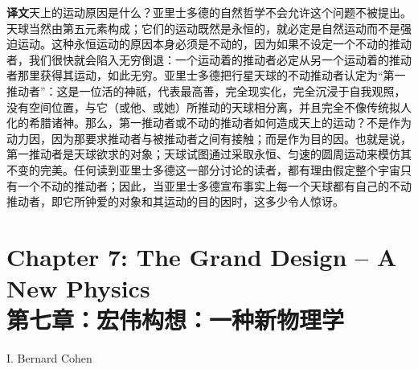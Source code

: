 \documentclass[UTF8,zihao=-4]{ctexart}
\newcommand{\BodyFont}{\fontsize{10.5pt}{15.5pt}\selectfont}
\newcommand{\translabel}{\textbf{译文}\quad}
\newcommand{\zhline}[1]{\par\endgroup\noindent\begingroup\BodyFont\translabel #1\par\endgroup\vspace{0.35em}}
\begin{document}
\zhline{天上的运动原因是什么？亚里士多德的自然哲学不会允许这个问题不被提出。天球当然由第五元素构成；它们的运动既然是永恒的，就必定是自然运动而不是强迫运动。这种永恒运动的原因本身必须是不动的，因为如果不设定一个不动的推动者，我们很快就会陷入无穷倒退：一个运动着的推动者必定从另一个运动着的推动者那里获得其运动，如此无穷。亚里士多德把行星天球的不动推动者认定为“第一推动者”：这是一位活的神祇，代表最高善，完全现实化，完全沉浸于自我观照，没有空间位置，与它（或他、或她）所推动的天球相分离，并且完全不像传统拟人化的希腊诸神。那么，第一推动者或不动的推动者如何造成天上的运动？不是作为动力因，因为那要求推动者与被推动者之间有接触；而是作为目的因。也就是说，第一推动者是天球欲求的对象；天球试图通过采取永恒、匀速的圆周运动来模仿其不变的完美。任何读到亚里士多德这一部分讨论的读者，都有理由假定整个宇宙只有一个不动的推动者；因此，当亚里士多德宣布事实上每一个天球都有自己的不动推动者，即它所钟爱的对象和其运动的目的因时，这多少令人惊讶。}



\section*{Chapter 7: The Grand Design -- A New Physics\\第七章：宏伟构想：一种新物理学}
\begin{flushright}
I. Bernard Cohen
\end{flushright}
\end{document}
